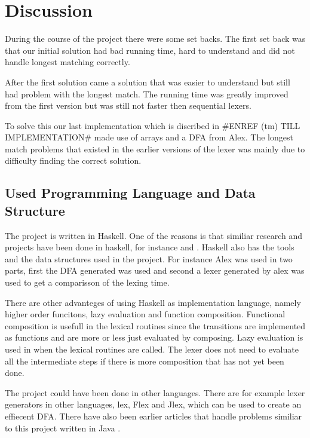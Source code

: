 \chapter{Discussion}
During the course of the project there were some set backs. The first set back
was that our initial solution had bad running time, hard to understand and did
not handle longest matching correctly.

After the first solution came a solution
that was easier to understand but still had problem with the longest match. The
running time was greatly improved from the first version but was still not
faster then sequential lexers.

To solve this our last implementation which is
discribed in \#ENREF (tm) TILL IMPLEMENTATION\# made use of arrays and a DFA from
Alex. The longest match problems that existed in the earlier versions of the
lexer was mainly due to difficulty finding the correct solution.

\section{Used Programming Language and Data Structure}
The project is written in Haskell. One of the reasons is that similiar
research and projects have been done in haskell, for instance \cite{blog} and \cite{fingertree}.
Haskell also has the tools and the data structures used in the project. For
instance Alex was used in two parts, first the DFA generated was used and second
a lexer generated by alex was used to get a comparisson of the lexing time.

There are other advanteges of using Haskell as implementation language, namely
higher order funcitons, lazy evaluation and function composition. Functional
composition is usefull in the lexical routines since the transitions are
implemented as functions and are more or less just evaluated by composing.
Lazy evaluation is used in when the lexical routines are called. The lexer does
not need to evaluate all the intermediate steps if there is more composition
that has not yet been done.

The project could have been done in other languages. There are for example
lexer generators in other languages, lex, Flex and Jlex, which can be used to
create an effiecent DFA. There have also been earlier articles that handle
problems similiar to this project written in Java \cite{JavaIncRegExp}.


